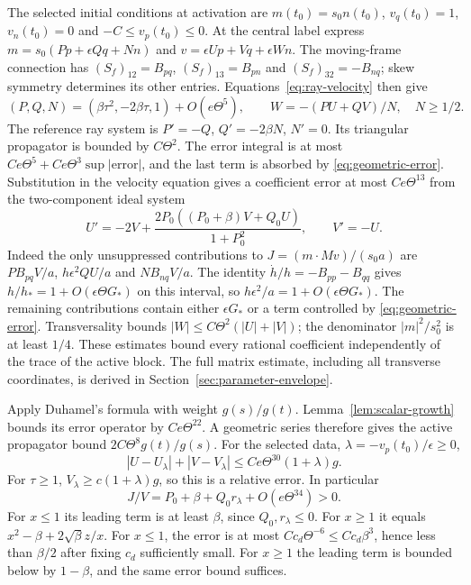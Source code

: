 \documentclass[11pt]{article}
\theoremstyle{definition}
\begin{document}
The selected initial conditions at activation are
$m(t_0)=s_0n(t_0)$, $v_q(t_0)=1$, $v_n(t_0)=0$ and
$-C\leq v_p(t_0)\leq0$. At the central label express
$m=s_0(Pp+\epsilon Qq+Nn)$ and
$v=\epsilon Up+Vq+\epsilon Wn$. The moving-frame connection has
$(S_f)_{12}=B_{pq}$, $(S_f)_{13}=B_{pn}$ and
$(S_f)_{32}=-B_{nq}$; skew symmetry determines its other entries.
Equations~\eqref{eq:ray-velocity} then give
\[
 (P,Q,N)=(\beta\tau^2,-2\beta\tau,1)+O(e\Theta^5),
 \qquad W=-(PU+QV)/N,\quad N\geq1/2.
\]
The reference ray system is $P'=-Q$, $Q'=-2\beta N$, $N'=0$.
Its triangular propagator is bounded by $C\Theta^2$. The error integral
is at most $Ce\Theta^5+Ce\Theta^3\sup|\mathrm{error}|$, and the last
term is absorbed by \eqref{eq:geometric-error}. Substitution in the
velocity equation gives a coefficient error at most $Ce\Theta^{13}$
from the two-component ideal system
\[
 U'=-2V+\frac{2P_0((P_0+\beta)V+Q_0U)}{1+P_0^2},\qquad V'=-U.
\]
Indeed the only unsuppressed contributions to
$J=(m\cdot Mv)/(s_0a)$ are $PB_{pq}V/a$, $h\epsilon^2QU/a$
and $NB_{nq}V/a$. The identity $\dot h/h=-B_{pp}-B_{qq}$ gives
$h/h_*=1+O(\epsilon\Theta G_*)$ on this interval, so
$h\epsilon^2/a=1+O(\epsilon\Theta G_*)$. The remaining contributions
contain either $\epsilon G_*$ or a term controlled by
\eqref{eq:geometric-error}. Transversality bounds
$|W|\leq C\Theta^2(|U|+|V|)$; the denominator $|m|^2/s_0^2$
is at least $1/4$. These estimates bound every rational coefficient
independently of the trace of the active block.
The full matrix estimate, including all transverse coordinates, is
derived in Section~\ref{sec:parameter-envelope}.

Apply Duhamel's formula with weight $g(s)/g(t)$.
Lemma~\ref{lem:scalar-growth} bounds its error operator by $Ce\Theta^{22}$. A geometric series therefore
gives the active propagator bound $2C\Theta^8g(t)/g(s)$.
For the selected data, $\lambda=-v_p(t_0)/\epsilon\geq0$,
\[
 |U-U_\lambda|+|V-V_\lambda|
       \leq Ce\Theta^{30}(1+\lambda)g.
\]
For $\tau\geq1$, $V_\lambda\geq c(1+\lambda)g$, so this is a
relative error. In particular
\begin{equation}\label{eq:positive-flux}
 J/V=P_0+\beta+Q_0r_\lambda+O(e\Theta^{34})>0.
\end{equation}
For $x\leq1$ its leading term is at least $\beta$, since
$Q_0,r_\lambda\leq0$. For $x\geq1$ it equals
$x^2-\beta+2\sqrt\beta z/x$. For $x\leq1$, the error is at most
$C c_d\Theta^{-6}\leq C c_d\beta^3$, hence less than $\beta/2$ after
fixing $c_d$ sufficiently small. For $x\geq1$ the leading term is
bounded below by $1-\beta$, and the same error bound suffices.
\end{document}

